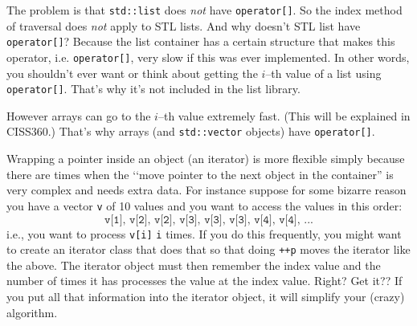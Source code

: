 The problem is that \verb!std::list! does \textit{not} have
\verb!operator[]!.
So the index method of traversal does \textit{not} apply to
STL lists.
And why doesn't STL list have \verb!operator[]!?
Because the list container has a certain structure that makes
this operator, i.e. \verb!operator[]!,
very slow if this was ever implemented.
In other words, you shouldn't ever want or think
about getting the $i$--th value
of a list using \verb!operator[]!.
That's why it's not included in the list library.

However arrays can go to the $i$--th value
extremely fast.
(This will be explained in CISS360.)
That's why arrays (and \verb!std::vector! objects)
have \verb!operator[]!.

Wrapping a pointer inside an object (an iterator)
is more flexible simply because there are times
when the \lq\lq move pointer to the next object in the container''
is very complex and needs extra data.
For instance suppose for some bizarre reason you
have a vector \verb!v! of 10 values and you want to access the
values in this order:
\[
\texttt{v[1], v[2], v[2], v[3], v[3], v[3], v[4], v[4], ...}
\]
i.e., you want to process \verb!v[i]! \verb!i! times.
If you do this frequently, you might want to create an iterator
class that does that so that doing \verb!++p! moves
the iterator like the above.
The iterator object must then remember the index value
 and the number of times it has processes the value at the index value.
 Right?
Get it??
If you put all that information into the iterator object,
it will simplify your (crazy) algorithm.
